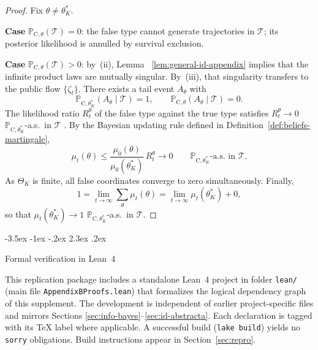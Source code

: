 \documentclass[12pt]{article}
\makeatletter
\numberwithin{equation}{section}
\numberwithin{table}{section}
\theoremstyle{definition}
\newcommand{\ProbC}[1]{\mathbb{P}_{\mathrm{C},#1}}
\renewcommand\section{\@startsection {section}{1}{\z@}%
                                   {-3.5ex \@plus -1ex \@minus -.2ex}%
                                   {2.3ex \@plus.2ex}%
                                   {\normalfont\Large\bfseries\raggedright}}
\makeatother
\begin{document}
\begin{proof}
Fix $\theta\neq\theta_K^\ast$.

\textbf{Case} $\ProbC{\theta}(\mathcal{T})=0$: the false type cannot generate
trajectories in $\mathcal{T}$; its posterior likelihood is annulled by survival
exclusion.

\textbf{Case} $\ProbC{\theta}(\mathcal{T})>0$: by~(ii), Lemma
~\ref{lem:general-id-appendix} implies that the infinite product laws are
mutually singular. By~(iii), that singularity transfers to the public flow
$\{\zeta_t\}$. There exists a tail event $A_\theta$ with
\[
\ProbC{\theta_K^\ast}(A_\theta\mid\mathcal{T})=1,\qquad
\ProbC{\theta}(A_\theta\mid\mathcal{T})=0.
\]
The likelihood ratio $R_t^\theta$ of the false type against the true type
satisfies $R_t^\theta\to 0$ $\ProbC{\theta_K^\ast}$-a.s.\ in $\mathcal{T}$
\citep{BlackwellDubins1962,Schervish1995Theory}. By the Bayesian updating rule defined in Definition~\ref{def:beliefs-martingale},
\[
\mu_t(\theta)
\le\frac{\mu_0(\theta)}{\mu_0(\theta_K^\ast)}\,R_t^\theta\to 0
\qquad\ProbC{\theta_K^\ast}\text{-a.s.\ in }\mathcal{T}.
\]
As $\Theta_K$ is finite, all false coordinates converge to zero
simultaneously. Finally,
\[
1=\lim_{t\to\infty}\sum_\theta\mu_t(\theta)
=\lim_{t\to\infty}\mu_t(\theta_K^\ast)+0,
\]
so that $\mu_t(\theta_K^\ast)\to 1$ $\ProbC{\theta_K^\ast}$-a.s.\ in
$\mathcal{T}$.
\end{proof}

\section{Formal verification in Lean~4}
\label{sec:lean-formalization}

\begin{sloppypar}
\noindent
This replication package includes a standalone Lean~4 project in folder
\texttt{lean/} (main file \texttt{AppendixBProofs.lean}) that
formalizes the logical dependency graph of this supplement. The development is
independent of earlier project-specific files and mirrors Sections
\ref{sec:info-bayes}--\ref{sec:id-abstracta}. Each declaration is tagged with its TeX
label where applicable. A successful build (\texttt{lake build}) yields no
\texttt{sorry} obligations. Build instructions appear in Section~\ref{sec:repro}.
\end{sloppypar}
\end{document}
